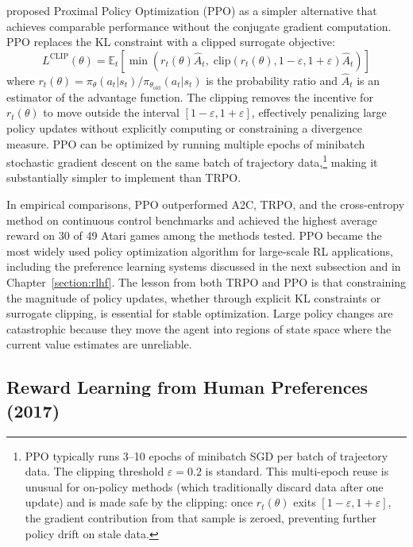\citet{Schulman2017} proposed Proximal Policy Optimization (PPO) as a simpler alternative that achieves comparable performance without the conjugate gradient computation. PPO replaces the KL constraint with a clipped surrogate objective:
\begin{equation}
L^{\text{CLIP}}(\theta) = \mathbb{E}_t \left[ \min\!\left( r_t(\theta) \hat{A}_t, \; \text{clip}(r_t(\theta), 1-\varepsilon, 1+\varepsilon) \hat{A}_t \right) \right]
\end{equation}
where $r_t(\theta) = \pi_\theta(a_t|s_t) / \pi_{\theta_{\text{old}}}(a_t|s_t)$ is the probability ratio and $\hat{A}_t$ is an estimator of the advantage function. The clipping removes the incentive for $r_t(\theta)$ to move outside the interval $[1-\varepsilon, 1+\varepsilon]$, effectively penalizing large policy updates without explicitly computing or constraining a divergence measure. PPO can be optimized by running multiple epochs of minibatch stochastic gradient descent on the same batch of trajectory data,\footnote{PPO typically runs 3--10 epochs of minibatch SGD per batch of trajectory data. The clipping threshold $\varepsilon = 0.2$ is standard. This multi-epoch reuse is unusual for on-policy methods (which traditionally discard data after one update) and is made safe by the clipping: once $r_t(\theta)$ exits $[1-\varepsilon, 1+\varepsilon]$, the gradient contribution from that sample is zeroed, preventing further policy drift on stale data.} making it substantially simpler to implement than TRPO.

In empirical comparisons, PPO outperformed A2C, TRPO, and the cross-entropy method on continuous control benchmarks and achieved the highest average reward on 30 of 49 Atari games among the methods tested. PPO became the most widely used policy optimization algorithm for large-scale RL applications, including the preference learning systems discussed in the next subsection and in Chapter~\ref{section:rlhf}. The lesson from both TRPO and PPO is that constraining the magnitude of policy updates, whether through explicit KL constraints or surrogate clipping, is essential for stable optimization. Large policy changes are catastrophic because they move the agent into regions of state space where the current value estimates are unreliable.

\subsection{Reward Learning from Human Preferences (2017)}

